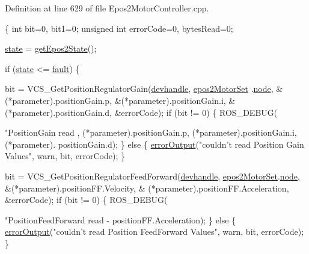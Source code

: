 Definition at line 629 of file Epos2\-Motor\-Controller.\-cpp.


\begin{DoxyCode}
\{
    \textcolor{keywordtype}{int} bit=0, bit1=0;
    \textcolor{keywordtype}{unsigned} \textcolor{keywordtype}{int} errorCode=0, bytesRead=0;

    \hyperlink{classEpos2MotorController_a7194b8efd4f2fd5a4d64b10135c416e2}{state} = \hyperlink{classEpos2MotorController_ac6c31e0dc57485aa817431b22627fc70}{getEpos2State}();

    \textcolor{keywordflow}{if} (\hyperlink{classEpos2MotorController_a7194b8efd4f2fd5a4d64b10135c416e2}{state} <= \hyperlink{classEpos2MotorController_ab5ec630dfbb90ad674e311187926060ca9c2b33ebbe5a72ad6d09d6af6531237c}{fault}) \{

        bit = VCS\_GetPositionRegulatorGain(\hyperlink{classEpos2MotorController_a40594faab444bcba221ab9d55d1162cd}{devhandle}, \hyperlink{classEpos2MotorController_a0856f5fdd71ffa3b84a536afa085bfb1}{epos2MotorSet}
      .\hyperlink{structEpos2MotorController_1_1epos2Settings_ab8f18d3df17e8de9ed5250a3e53292c6}{node}, &(*parameter).positionGain.p, &(*parameter).positionGain.i, &
      (*parameter).positionGain.d, &errorCode);
        \textcolor{keywordflow}{if} (bit != 0) \{
            ROS\_DEBUG(\textcolor{stringliteral}{"PositionGain read %
      , (*parameter).positionGain.p, (*parameter).positionGain.i, (*parameter).
      positionGain.d);
        \} \textcolor{keywordflow}{else} \{
            \hyperlink{classEpos2MotorController_a64d5e3e3858597c111e60ba8b382a63b}{errorOutput}(\textcolor{stringliteral}{"couldn't read Position Gain Values"}, warn, 
       bit, errorCode);
        \}

        bit = VCS\_GetPositionRegulatorFeedForward(\hyperlink{classEpos2MotorController_a40594faab444bcba221ab9d55d1162cd}{devhandle}, 
      \hyperlink{classEpos2MotorController_a0856f5fdd71ffa3b84a536afa085bfb1}{epos2MotorSet}.\hyperlink{structEpos2MotorController_1_1epos2Settings_ab8f18d3df17e8de9ed5250a3e53292c6}{node}, &(*parameter).positionFF.Velocity, &
      (*parameter).positionFF.Acceleration, &errorCode);
        \textcolor{keywordflow}{if} (bit != 0) \{
            ROS\_DEBUG(\textcolor{stringliteral}{"PositionFeedForward read %
       - %
      positionFF.Acceleration);
        \} \textcolor{keywordflow}{else} \{
            \hyperlink{classEpos2MotorController_a64d5e3e3858597c111e60ba8b382a63b}{errorOutput}(\textcolor{stringliteral}{"couldn't read Position FeedForward Values"},
       warn,  bit, errorCode);
        \}

}}
\end{DoxyCode}
